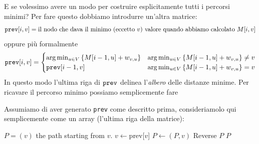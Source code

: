 \documentclass[11pt]{scrartcl}
\begin{document}
	E se volessimo avere un modo per costruire esplicitamente tutti i percorsi minimi? Per fare questo dobbiamo introdurre un'altra matrice:
	$$\verb|prev|[i,v]=\text{il nodo che dava il minimo (eccetto $v$) valore quando abbiamo calcolato $M[i,v]$}$$
	oppure più formalmente
	$$\verb*|prev|[i,v]=
	\begin{cases}
		 \arg\min_{u\in V}\left\{M[i-1,u]+w_{v,u}\right\} & \arg\min_{u\in V}\left\{M[i-1,u]+w_{v,u}\right\}\ne v \\
		 \verb*|prev|[i-1,v] & \arg\min_{u\in V}\left\{M[i-1,u]+w_{v,u}\right\}=v
	\end{cases}
	$$
	In questo modo l'ultima riga di $\verb*|prev|$ delinea l'\textit{albero} delle distanze minime. Per ricavare il percorso minimo possiamo semplicemente fare 
	\begin{algorithm}[DFS]
		Assumiamo di aver generato \verb*|prev| come descritto prima, consideriamolo qui semplicemente come un array (l'ultima riga della matrice):
		\begin{algorithmic}[1]
				\State $P=(v)$ the path starting from $v$.
					\State $v\gets $prev[$v$]
					\State $P\gets (P,v)$
				\EndWhile
				\State Reverse $P$
				\State \Return $P$
			\EndFunction
		\end{algorithmic}
	\end{algorithm}
	
\end{document}
